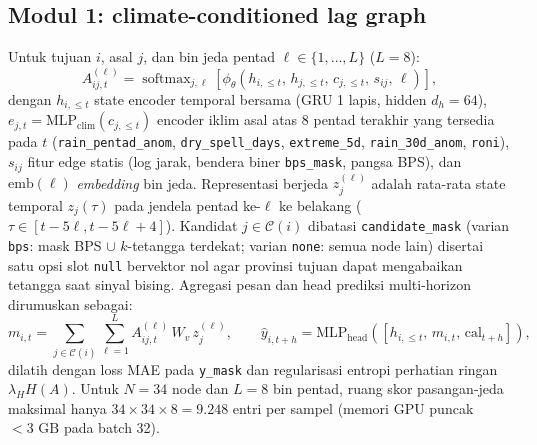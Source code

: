 \documentclass[11pt,a4paper]{article}
\begin{document}
\subsection{Modul 1: climate-conditioned lag graph}
Untuk tujuan $i$, asal $j$, dan bin jeda pentad $\ell \in \{1,\dots,L\}$ ($L=8$):
\begin{equation}
A^{(\ell)}_{ij,t}
= \operatorname{softmax}_{j,\ell}
\left[
\phi_\theta\left(h_{i,\le t},\, h_{j,\le t},\, c_{j,\le t},\, s_{ij},\, \ell\right)
\right],
\label{eq:module1}
\end{equation}
dengan $h_{i,\le t}$ state encoder temporal bersama (GRU 1 lapis, hidden $d_h=64$),
$e_{j,t}=\mathrm{MLP}_{\text{clim}}(c_{j,\le t})$ encoder iklim asal atas 8 pentad terakhir
yang tersedia pada $t$ (\texttt{rain\_pentad\_anom}, \texttt{dry\_spell\_days},
\texttt{extreme\_5d}, \texttt{rain\_30d\_anom}, \texttt{roni}), $s_{ij}$ fitur edge statis
(log jarak, bendera biner \texttt{bps\_mask}, pangsa BPS), dan $\mathrm{emb}(\ell)$
\textit{embedding} bin jeda. Representasi berjeda $z_j^{(\ell)}$ adalah rata-rata state
temporal $z_j(\tau)$ pada jendela pentad ke-$\ell$ ke belakang ($\tau \in [t-5\ell, t-5\ell+4]$).
Kandidat $j \in \mathcal{C}(i)$ dibatasi \texttt{candidate\_mask} (varian \texttt{bps}:
mask BPS $\cup$ $k$-tetangga terdekat; varian \texttt{none}: semua node lain) disertai satu
opsi slot \texttt{null} bervektor nol agar provinsi tujuan dapat mengabaikan tetangga saat
sinyal bising. Agregasi pesan dan head prediksi multi-horizon dirumuskan sebagai:
\begin{equation}
m_{i,t} = \sum_{j \in \mathcal{C}(i)} \sum_{\ell=1}^{L} A^{(\ell)}_{ij,t}\, W_v\, z_j^{(\ell)},
\qquad
\hat{y}_{i,t+h} = \mathrm{MLP}_{\text{head}}\!\left([h_{i,\le t},\, m_{i,t},\, \mathrm{cal}_{t+h}]\right),
\end{equation}
dilatih dengan loss MAE pada \texttt{y\_mask} dan regularisasi entropi perhatian ringan
$\lambda_H H(A)$. Untuk $N=34$ node dan $L=8$ bin pentad, ruang skor pasangan-jeda maksimal
hanya $34 \times 34 \times 8 = 9.248$ entri per sampel (memori GPU puncak $< 3\text{ GB}$
pada batch 32).
\end{document}
